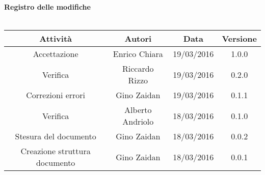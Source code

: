 \vspace{1cm}
   {\fontsize{15pt}{16pt}\selectfont \textbf{Registro delle modifiche}}\\ \\

\bgroup
\def\arraystretch{1.6}
\begin{tabular}{| c | c | c | c |}
\hline
\textbf{Attività} & \textbf{Autori} & \textbf{Data} & \textbf{Versione}\\ \hline \hline


Accettazione & Enrico Chiara & 19/03/2016 &  1.0.0
\\ 
\hline  

Verifica & Riccardo Rizzo  & 19/03/2016 & 0.2.0  \\ 
\hline

Correzioni errori & Gino Zaidan & 19/03/2016 & 0.1.1 \\ 
\hline

Verifica & Alberto Andriolo & 18/03/2016 & 0.1.0  \\ \hline

Stesura del documento & Gino Zaidan & 18/03/2016 & 0.0.2 \\ 
\hline

Creazione struttura documento & Gino Zaidan & 18/03/2016 & 0.0.1 \\ 
\hline


\end{tabular}
\egroup
\newpage